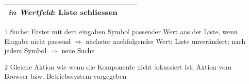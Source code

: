 \begin{table}[!htb]
\begin{threeparttable}
\begin{tabular}{ l || l | l }
{                                                  \emph{in Wertfeld}: Liste schliessen} \\
            \hline
        \end{tabular}
        \begin{tablenotes}
            \scriptsize
            \item[1] Suche: Erster mit dem eingaben Symbol passender Wert aus der Liste, wenn Eingabe nicht passend $\Rightarrow$ nächster nachfolgender Wert; 
                            Liste unverändert; nach jedem Symbol $\Rightarrow$ neue Suche
            \item[2] Gleiche Aktion wie wenn die Komponente nicht fokussiert ist; Aktion vom Browser bzw. Betriebssystem vorgegeben
        \end{tablenotes}
    \end{threeparttable}
\end{table}
